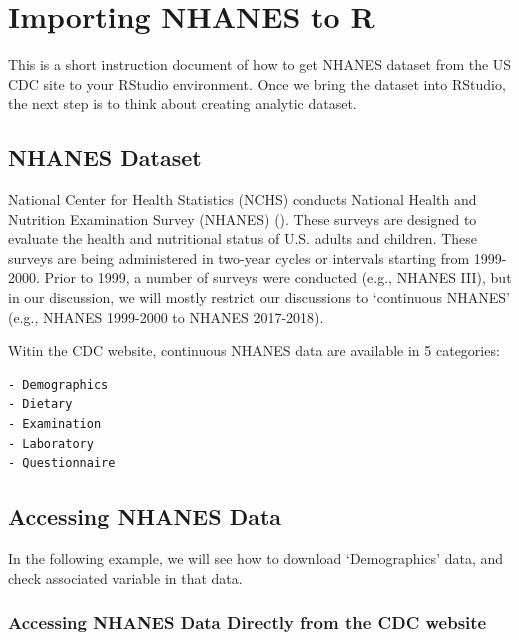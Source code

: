 \documentclass[
]{book}
\begin{document}
\hypertarget{importing-nhanes-to-r}{%
\chapter{Importing NHANES to R}\label{importing-nhanes-to-r}}

This is a short instruction document of how to get NHANES dataset from the US CDC site to your RStudio environment. Once we bring the dataset into RStudio, the next step is to think about creating analytic dataset.

\hypertarget{nhanes-dataset}{%
\section{NHANES Dataset}\label{nhanes-dataset}}

National Center for Health Statistics (NCHS) conducts National Health and Nutrition Examination Survey (NHANES) (\citet{nhanes}). These surveys are designed to evaluate the health and nutritional status of U.S. adults and children. These surveys are being administered in two-year cycles or intervals starting from 1999-2000. Prior to 1999, a number of surveys were conducted (e.g., NHANES III), but in our discussion, we will mostly restrict our discussions to `continuous NHANES' (e.g., NHANES 1999-2000 to NHANES 2017-2018).

Witin the CDC website, continuous NHANES data are available in 5 categories:

\begin{verbatim}
- Demographics
- Dietary
- Examination
- Laboratory
- Questionnaire
\end{verbatim}

\hypertarget{accessing-nhanes-data}{%
\section{Accessing NHANES Data}\label{accessing-nhanes-data}}

In the following example, we will see how to download `Demographics' data, and check associated variable in that data.

\hypertarget{accessing-nhanes-data-directly-from-the-cdc-website}{%
\subsection{Accessing NHANES Data Directly from the CDC website}\label{accessing-nhanes-data-directly-from-the-cdc-website}}
\end{document}

